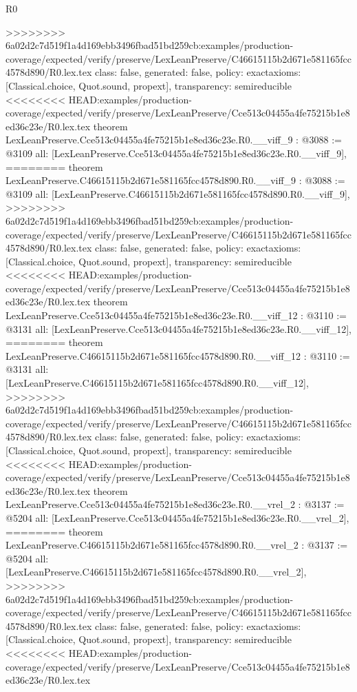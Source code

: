 \begin{lexlean}{R0}
\begin{coremodule}
{{{{{{{{{{{{{{{{{{{{{{{{{{{{{{{{{{{{{{{{{{{{{{{{{{{{{{{{{{{{{{{{{{>>>>>>>> 6a02d2c7d519f1a4d169ebb3496fbad51bd259cb:examples/production-coverage/expected/verify/preserve/LexLeanPreserve/C46615115b2d671e581165fcc4578d890/R0.lex.tex
  class: false,
  generated: false,
  policy: exact{axioms: [Classical.choice, Quot.sound, propext]},
  transparency: semireducible
}
<<<<<<<< HEAD:examples/production-coverage/expected/verify/preserve/LexLeanPreserve/Cce513c04455a4fe75215b1e8ed36c23e/R0.lex.tex
theorem LexLeanPreserve.Cce513c04455a4fe75215b1e8ed36c23e.R0.__viff_9 : @3088 := @3109 {
  all: [LexLeanPreserve.Cce513c04455a4fe75215b1e8ed36c23e.R0.__viff_9],
========
theorem LexLeanPreserve.C46615115b2d671e581165fcc4578d890.R0.__viff_9 : @3088 := @3109 {
  all: [LexLeanPreserve.C46615115b2d671e581165fcc4578d890.R0.__viff_9],
>>>>>>>> 6a02d2c7d519f1a4d169ebb3496fbad51bd259cb:examples/production-coverage/expected/verify/preserve/LexLeanPreserve/C46615115b2d671e581165fcc4578d890/R0.lex.tex
  class: false,
  generated: false,
  policy: exact{axioms: [Classical.choice, Quot.sound, propext]},
  transparency: semireducible
}
<<<<<<<< HEAD:examples/production-coverage/expected/verify/preserve/LexLeanPreserve/Cce513c04455a4fe75215b1e8ed36c23e/R0.lex.tex
theorem LexLeanPreserve.Cce513c04455a4fe75215b1e8ed36c23e.R0.__viff_12 : @3110 := @3131 {
  all: [LexLeanPreserve.Cce513c04455a4fe75215b1e8ed36c23e.R0.__viff_12],
========
theorem LexLeanPreserve.C46615115b2d671e581165fcc4578d890.R0.__viff_12 : @3110 := @3131 {
  all: [LexLeanPreserve.C46615115b2d671e581165fcc4578d890.R0.__viff_12],
>>>>>>>> 6a02d2c7d519f1a4d169ebb3496fbad51bd259cb:examples/production-coverage/expected/verify/preserve/LexLeanPreserve/C46615115b2d671e581165fcc4578d890/R0.lex.tex
  class: false,
  generated: false,
  policy: exact{axioms: [Classical.choice, Quot.sound, propext]},
  transparency: semireducible
}
<<<<<<<< HEAD:examples/production-coverage/expected/verify/preserve/LexLeanPreserve/Cce513c04455a4fe75215b1e8ed36c23e/R0.lex.tex
theorem LexLeanPreserve.Cce513c04455a4fe75215b1e8ed36c23e.R0.__vrel_2 : @3137 := @5204 {
  all: [LexLeanPreserve.Cce513c04455a4fe75215b1e8ed36c23e.R0.__vrel_2],
========
theorem LexLeanPreserve.C46615115b2d671e581165fcc4578d890.R0.__vrel_2 : @3137 := @5204 {
  all: [LexLeanPreserve.C46615115b2d671e581165fcc4578d890.R0.__vrel_2],
>>>>>>>> 6a02d2c7d519f1a4d169ebb3496fbad51bd259cb:examples/production-coverage/expected/verify/preserve/LexLeanPreserve/C46615115b2d671e581165fcc4578d890/R0.lex.tex
  class: false,
  generated: false,
  policy: exact{axioms: [Classical.choice, Quot.sound, propext]},
  transparency: semireducible
}
<<<<<<<< HEAD:examples/production-coverage/expected/verify/preserve/LexLeanPreserve/Cce513c04455a4fe75215b1e8ed36c23e/R0.lex.tex
}}}}}}}}}}}}}}}}}}}}}}}}}}}}}}}}}}}}}}}}}}}}}}}}}}}}}}}}}}}}}}}}}}}}
\end{coremodule}
\end{lexlean}

